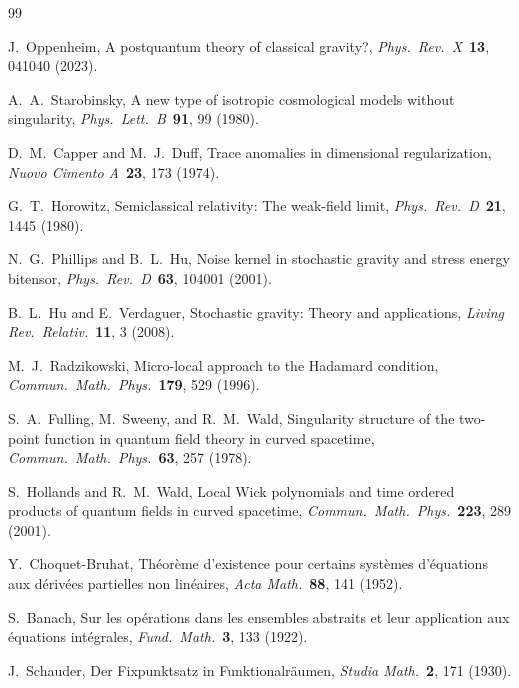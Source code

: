 \documentclass[12pt,a4paper]{article}
\begin{document}
\begin{thebibliography}{99}

 J.~Oppenheim, A postquantum theory of classical gravity?,
\textit{Phys.\ Rev.\ X}\ \textbf{13}, 041040 (2023).

 A.~A.~Starobinsky, A new type of isotropic cosmological models
without singularity, \textit{Phys.\ Lett.\ B}\ \textbf{91}, 99 (1980).

 D.~M.~Capper and M.~J.~Duff, Trace anomalies in dimensional
regularization, \textit{Nuovo Cimento A}\ \textbf{23}, 173 (1974).

 G.~T.~Horowitz, Semiclassical relativity: The weak-field limit,
\textit{Phys.\ Rev.\ D}\ \textbf{21}, 1445 (1980).

 N.~G.~Phillips and B.~L.~Hu, Noise kernel in stochastic gravity and
stress energy bitensor, \textit{Phys.\ Rev.\ D}\ \textbf{63}, 104001 (2001).

 B.~L.~Hu and E.~Verdaguer, Stochastic gravity: Theory and
applications, \textit{Living Rev.\ Relativ.}\ \textbf{11}, 3 (2008).

 M.~J.~Radzikowski, Micro-local approach to the Hadamard condition,
\textit{Commun.\ Math.\ Phys.}\ \textbf{179}, 529 (1996).

 S.~A.~Fulling, M.~Sweeny, and R.~M.~Wald, Singularity
structure of the two-point function in quantum field theory in curved spacetime,
\textit{Commun.\ Math.\ Phys.}\ \textbf{63}, 257 (1978).

 S.~Hollands and R.~M.~Wald, Local Wick polynomials and time
ordered products of quantum fields in curved spacetime, \textit{Commun.\ Math.\ Phys.}\
\textbf{223}, 289 (2001).

 Y.~Choquet-Bruhat, Th\'eor\`eme d'existence pour certains
syst\`emes d'\'equations aux d\'eriv\'ees partielles non lin\'eaires, \textit{Acta Math.}\
\textbf{88}, 141 (1952).

 S.~Banach, Sur les op\'erations dans les ensembles abstraits et leur
application aux \'equations int\'egrales, \textit{Fund.\ Math.}\ \textbf{3}, 133 (1922).

\bibitem{schauder} J.~Schauder, Der Fixpunktsatz in Funktionalr\"aumen,
\textit{Studia Math.}\ \textbf{2}, 171 (1930).


\end{thebibliography}
\end{document}

